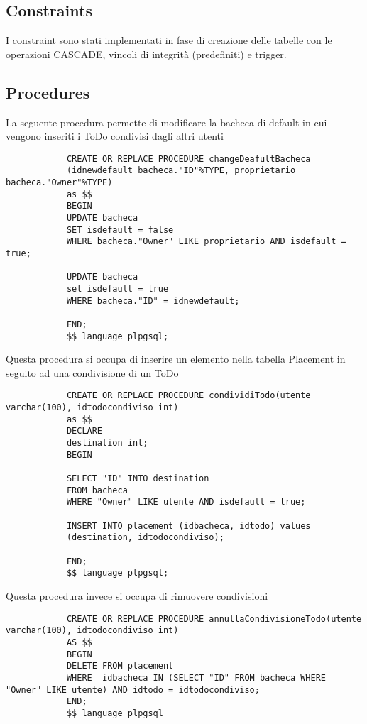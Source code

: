 \documentclass{article}
\begin{document}
		\subsection{Constraints}
		
		I constraint sono stati implementati in fase di creazione delle tabelle con le operazioni CASCADE, vincoli di integrità (predefiniti) e trigger.
		
		
		\subsection{Procedures}
		
		La seguente procedura permette di modificare la bacheca di default in cui vengono inseriti i ToDo condivisi dagli altri utenti
			\begin{lstlisting}
			CREATE OR REPLACE PROCEDURE changeDeafultBacheca
			(idnewdefault bacheca."ID"%TYPE, proprietario bacheca."Owner"%TYPE)
			as $$
			BEGIN
			UPDATE bacheca
			SET isdefault = false
			WHERE bacheca."Owner" LIKE proprietario AND isdefault = true;
			
			UPDATE bacheca
			set isdefault = true
			WHERE bacheca."ID" = idnewdefault;
			
			END;
			$$ language plpgsql;
		\end{lstlisting}
		\hfill \linebreak[2]
		
		Questa procedura si occupa di inserire un elemento nella tabella Placement in seguito ad una condivisione di un ToDo
			\begin{lstlisting}
			CREATE OR REPLACE PROCEDURE condividiTodo(utente varchar(100), idtodocondiviso int)
			as $$
			DECLARE
			destination int;
			BEGIN
			
			SELECT "ID" INTO destination
			FROM bacheca
			WHERE "Owner" LIKE utente AND isdefault = true;
			
			INSERT INTO placement (idbacheca, idtodo) values
			(destination, idtodocondiviso);
			
			END; 
			$$ language plpgsql;
		\end{lstlisting}
		\hfill \linebreak[2]
		
		Questa procedura invece si occupa di rimuovere condivisioni
			\begin{lstlisting}
			CREATE OR REPLACE PROCEDURE annullaCondivisioneTodo(utente varchar(100), idtodocondiviso int)
			AS $$
			BEGIN
			DELETE FROM placement
			WHERE  idbacheca IN (SELECT "ID" FROM bacheca WHERE "Owner" LIKE utente) AND idtodo = idtodocondiviso;
			END; 
			$$ language plpgsql
		\end{lstlisting}
		\hfill \linebreak[2]
		
\end{document}
